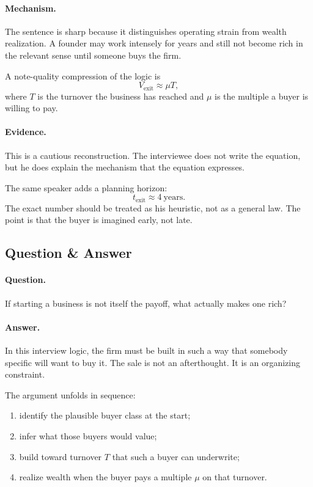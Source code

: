 \documentclass[11pt,oneside]{book}
\begin{document}
\paragraph{Mechanism.} The sentence is sharp because it distinguishes operating strain from wealth realization. A founder may work intensely for years and still not become rich in the relevant sense until someone buys the firm.

A note-quality compression of the logic is
\begin{equation}
V_{\mathrm{exit}} \approx \mu T,
\end{equation}
where \(T\) is the turnover the business has reached and \(\mu\) is the multiple a buyer is willing to pay.

\paragraph{Evidence.} This is a cautious reconstruction. The interviewee does not write the equation, but he does explain the mechanism that the equation expresses.

The same speaker adds a planning horizon:
\begin{equation}
t_{\mathrm{exit}} \approx 4\ \text{years}.
\end{equation}
The exact number should be treated as his heuristic, not as a general law. The point is that the buyer is imagined early, not late.

\subsection{Question \& Answer}

\paragraph{Question.} If starting a business is not itself the payoff, what actually makes one rich?

\paragraph{Answer.} In this interview logic, the firm must be built in such a way that somebody specific will want to buy it. The sale is not an afterthought. It is an organizing constraint.

The argument unfolds in sequence:
\begin{enumerate}
\item identify the plausible buyer class at the start;
\item infer what those buyers would value;
\item build toward turnover \(T\) that such a buyer can underwrite;
\item realize wealth when the buyer pays a multiple \(\mu\) on that turnover.
\end{enumerate}
\end{document}
